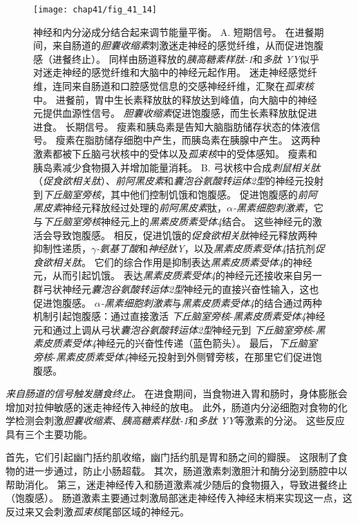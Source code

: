 \begin{figure}[htbp]
	\centering
	\texttt{[image: chap41/fig\_41\_14]}
	\caption{神经和内分泌成分结合起来调节能量平衡。 
		A. 短期信号。
		在进餐期间，来自肠道的\textit{胆囊收缩素}刺激迷走神经的感觉纤维，从而促进饱腹感（进餐终止）。
		同样由肠道释放的\textit{胰高糖素样肽-1}和\textit{多肽 YY}似乎对迷走神经的感觉纤维和大脑中的神经元起作用。
		迷走神经感觉纤维，连同来自肠道和口腔感觉信息的交感神经纤维，汇聚在\textit{孤束核}中。
		进餐前，胃中生长素释放肽的释放达到峰值，向大脑中的神经元提供血源性信号。
		\textit{胆囊收缩素}促进饱腹感，而生长素释放肽促进进食。
		长期信号。
		瘦素和胰岛素是告知大脑脂肪储存状态的体液信号。
		瘦素在脂肪储存细胞中产生，而胰岛素在胰腺中产生。
		这两种激素都被下丘脑弓状核中的受体以及\textit{孤束核}中的受体感知。
		瘦素和胰岛素减少食物摄入并增加能量消耗。
		B. 弓状核中合成\textit{刺鼠相关肽}（\textit{促食欲相关肽}）、\textit{前阿黑皮素}和\textit{囊泡谷氨酸转运体2型}的神经元投射到\textit{下丘脑室旁核}，其中他们控制饥饿和饱腹感。
		促进饱腹感的\textit{前阿黑皮素}神经元释放经过处理的\textit{前阿黑皮素}肽，\textit{$\alpha$-黑素细胞刺激素}，它与\textit{下丘脑室旁核}神经元上的\textit{黑素皮质素受体4}结合。
		这些神经元的激活会导致饱腹感。
		相反，促进饥饿的\textit{促食欲相关肽}神经元释放两种抑制性递质，\textit{$\gamma$-氨基丁酸}和\textit{神经肽Y}，以及\textit{黑素皮质素受体4}拮抗剂\textit{促食欲相关肽}。
		它们的综合作用是抑制表达\textit{黑素皮质素受体4}的神经元，从而引起饥饿。
		表达\textit{黑素皮质素受体4}的神经元还接收来自另一群弓状神经元\textit{囊泡谷氨酸转运体2型}神经元的直接兴奋性输入，这也促进饱腹感。
		\textit{$\alpha$-黑素细胞刺激素}与\textit{黑素皮质素受体4}的结合通过两种机制引起饱腹感：通过直接激活 \textit{下丘脑室旁核}-\textit{黑素皮质素受体4}神经元和通过上调从弓状\textit{囊泡谷氨酸转运体2型}神经元到 \textit{下丘脑室旁核}-\textit{黑素皮质素受体4}神经元的兴奋性传递（蓝色箭头）。
		最后，\textit{下丘脑室旁核}-\textit{黑素皮质素受体4}神经元投射到外侧臂旁核，在那里它们促进饱腹感。}
	\label{fig:41_14}
\end{figure}


\textit{来自肠道的信号触发膳食终止。}
在进食期间，当食物进入胃和肠时，身体膨胀会增加对拉伸敏感的迷走神经传入神经的放电。
此外，肠道内分泌细胞对食物的化学检测会刺激\textit{胆囊收缩素}、\textit{胰高糖素样肽-1}和\textit{多肽 YY}等激素的分泌。
这些反应具有三个主要功能。


首先，它们引起幽门括约肌收缩，幽门括约肌是胃和肠之间的瓣膜。
这限制了食物的进一步通过，防止小肠超载。
其次，肠道激素刺激胆汁和酶分泌到肠腔中以帮助消化。
第三，迷走神经传入和肠道激素减少随后的食物摄入，导致进餐终止（饱腹感）。
肠道激素主要通过刺激局部迷走神经传入神经末梢来实现这一点，这反过来又会刺激\textit{孤束核}尾部区域的神经元。


